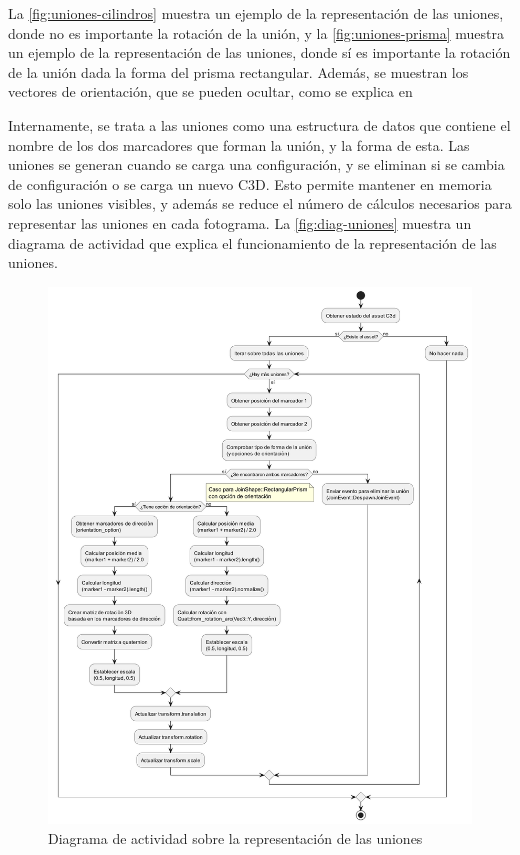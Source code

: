 La \autoref{fig:uniones-cilindros} muestra un ejemplo de la representación de las uniones, donde no es importante la rotación de la unión, y la \autoref{fig:uniones-prisma} muestra un ejemplo de la representación de las uniones, donde sí es importante la rotación de la unión dada la forma del prisma rectangular. Además, se muestran los vectores de orientación, que se pueden ocultar, como se explica en 

Internamente, se trata a las uniones como una estructura de datos que contiene el nombre de los dos marcadores que forman la unión, y la forma de esta. Las uniones se generan cuando se carga una configuración, y se eliminan si se cambia de configuración o se carga un nuevo \ac{C3D}. Esto permite mantener en memoria solo las uniones visibles, y además se reduce el número de cálculos necesarios para representar las uniones en cada fotograma. La \autoref{fig:diag-uniones} muestra un diagrama de actividad que explica el funcionamiento de la representación de las uniones. 

\begin{figure}[H]
  \centering
  \includegraphics[width=\textwidth]{imagenes/diagramas/uniones.png}
  \caption{Diagrama de actividad sobre la representación de las uniones}
  \label{fig:diag-uniones}
\end{figure}

